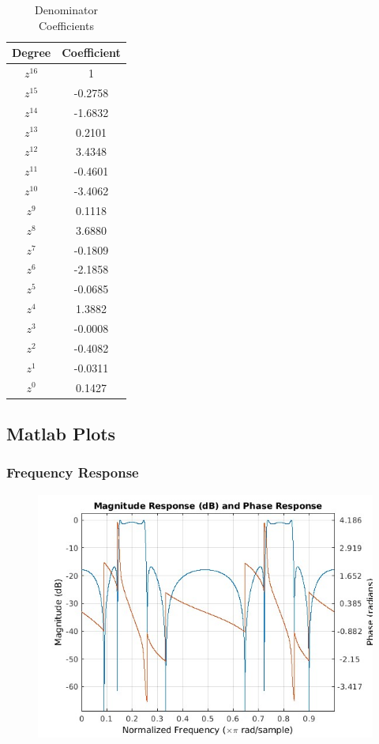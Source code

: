 \documentclass{article}
\begin{document}
\begin{table}[H]
    \centering
    \caption{Denominator Coefficients}
    \begin{tabular}{|c|c|}
        \hline
        Degree  & Coefficient \\
        \hline
        $z^{16}$ & 1 \\ \hline
        $z^{15}$ & -0.2758 \\ \hline
        $z^{14}$ & -1.6832 \\ \hline
        $z^{13}$ & 0.2101 \\ \hline
        $z^{12}$ & 3.4348 \\ \hline
        $z^{11}$ & -0.4601 \\ \hline
        $z^{10}$ & -3.4062 \\ \hline
        $z^9$ & 0.1118 \\ \hline
        $z^8$ & 3.6880 \\ \hline
        $z^7$ & -0.1809 \\ \hline
        $z^6$ & -2.1858 \\ \hline
        $z^5$ & -0.0685 \\ \hline
        $z^4$ & 1.3882 \\ \hline
        $z^3$ & -0.0008 \\ \hline
        $z^2$ & -0.4082 \\ \hline
        $z^1$ & -0.0311 \\ \hline
        $z^0$ & 0.1427 \\ 
        \hline
    \end{tabular}
\end{table}
\subsection{Matlab Plots}
\subsubsection{Frequency Response}
\begin{figure}[H]
\hspace*{-2.5cm}
    \centering
    \includegraphics[width=1.5\linewidth, height=0.65\textheight]{multi_IIR_elliptic_freq.jpg}
    \label{fig:my_label}
\end{figure}
\end{document}

